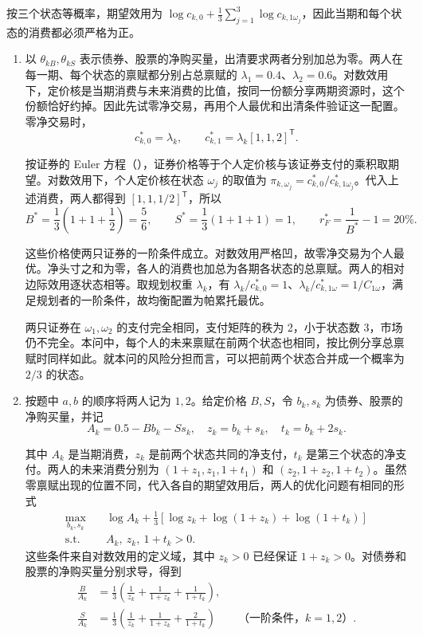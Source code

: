 \begin{solution}[blank-type=manual,blank-vsep=10\baselineskip]
按三个状态等概率，期望效用为 $\log c_{k,0}+\tfrac13\sum_{j=1}^3\log c_{k,1\omega_j}$，因此当期和每个状态的消费都必须严格为正。
\begin{enumerate}[label=(\alph*)]
\item 以 $\theta_{kB},\theta_{kS}$ 表示债券、股票的净购买量，出清要求两者分别加总为零。两人在每一期、每个状态的禀赋都分别占总禀赋的 $\lambda_1=0.4$、$\lambda_2=0.6$。对数效用下，定价核是当期消费与未来消费的比值，按同一份额分享两期资源时，这个份额恰好约掉。因此先试零净交易，再用个人最优和出清条件验证这一配置。零净交易时，
\[
 c_{k,0}^*=\lambda_k,\qquad
 c_{k,1}^*=\lambda_k[1,1,2]^{\mathsf T}.
\]

按证券的 Euler 方程\ifdefined\WJHandoutKnowledge（）\fi，证券价格等于个人定价核与该证券支付的乘积取期望。对数效用下，个人定价核在状态 $\omega_j$ 的取值为 $\pi_{k,\omega_j}=c_{k,0}^*/c_{k,1\omega_j}^*$。代入上述消费，两人都得到 $[1,1,1/2]^{\mathsf T}$，所以
\[
 B^*=\frac13\left(1+1+\frac12\right)=\frac56,
 \qquad S^*=\frac13(1+1+1)=1,
 \qquad r_F^*=\frac1{B^*}-1=20\%.
\]

这些价格使两只证券的一阶条件成立。对数效用严格凹，故零净交易为个人最优。净头寸之和为零，各人的消费也加总为各期各状态的总禀赋。两人的相对边际效用逐状态相等。取规划权重 $\lambda_k$，有 $\lambda_k/c_{k,0}^*=1$、$\lambda_k/c_{k,1\omega}^*=1/C_{1\omega}$，满足规划者的一阶条件，故均衡配置为帕累托最优。

两只证券在 $\omega_1,\omega_2$ 的支付完全相同，支付矩阵的秩为 2，小于状态数 3，市场仍不完全。本问中，每个人的未来禀赋在前两个状态也相同，按比例分享总禀赋时同样如此。就本问的风险分担而言，可以把前两个状态合并成一个概率为 $2/3$ 的状态。

\item 按题中 $a,b$ 的顺序将两人记为 $1,2$。给定价格 $B,S$，令 $b_k,s_k$ 为债券、股票的净购买量，并记
\[
 A_k=0.5-Bb_k-Ss_k,\quad z_k=b_k+s_k,\quad t_k=b_k+2s_k.
\]

其中 $A_k$ 是当期消费，$z_k$ 是前两个状态共同的净支付，$t_k$ 是第三个状态的净支付。两人的未来消费分别为 $(1+z_1,z_1,1+t_1)$ 和 $(z_2,1+z_2,1+t_2)$。虽然零禀赋出现的位置不同，代入各自的期望效用后，两人的优化问题有相同的形式
\[
 \begin{aligned}
 \max_{b_k,s_k}\quad
 &\log A_k+\frac13[\log z_k+\log(1+z_k)+\log(1+t_k)]\\
 \text{s.t.}\quad &A_k,\ z_k,\ 1+t_k>0 .
 \end{aligned}
\]
这些条件来自对数效用的定义域，其中 $z_k>0$ 已经保证 $1+z_k>0$。对债券和股票的净购买量分别求导，得到
\[
 \begin{aligned}
 \frac{B}{A_k}&=\frac13\left(\frac1{z_k}+\frac1{1+z_k}+\frac1{1+t_k}\right),\\
 \frac{S}{A_k}&=\frac13\left(\frac1{z_k}+\frac1{1+z_k}+\frac2{1+t_k}\right)
 \qquad\text{（一阶条件，$k=1,2$）}.
 \end{aligned}
\]


\end{enumerate}
\end{solution}
